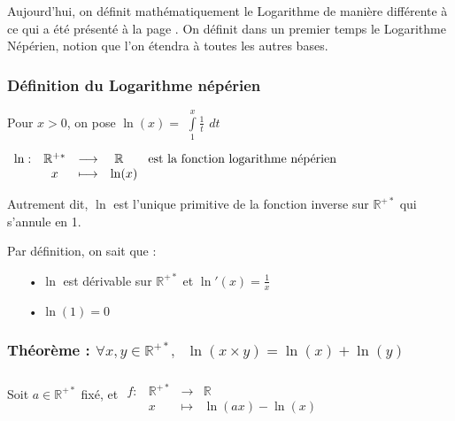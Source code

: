 \documentclass[a4paper, twoside]{article}
\begin{document}
	Aujourd'hui, on définit mathématiquement le Logarithme de manière différente à ce qui a été présenté à la page \pageref{intro_log}. On définit dans un premier temps le Logarithme Népérien, notion que l'on étendra à toutes les autres bases.

	\subsubsection*{Définition du Logarithme népérien}

	Pour $x>0$, on pose $\ln(x) =$ {\Large $\int\limits_1^x \frac{1}{t}$} {\large $dt$}\\

	\vspace{-3 mm}

	\begin{center}
	\begin{large}
	$\begin{array}{lccl}
	\ln : & \mathbb{R}^{+*} & \longrightarrow & ~ \mathbb{R} ~~~~~~ \text{{\normalsize est la fonction logarithme népérien}}\\
		& x & \longmapsto & \ln(x)
	\end{array}$
	\end{large}
	\end{center}

	Autrement dit, $\ln$ est l'unique primitive de la fonction inverse sur $\mathbb{R}^{+*}$ qui s'annule en 1.

	\vspace{3 mm}

	Par définition, on sait que :
	\begin{itemize}
		\item[•] $\ln$ est dérivable sur $\mathbb{R}^{+*}$ et $\ln '(x) = \frac{1}{x}$
		\item[•] $\ln(1)=0$\\
	\end{itemize}





	\subsubsection*{Théorème : $\forall x, y \in \mathbb{R}^{+*},$ {\Large $~\ln(x\times y) = \ln(x) + \ln(y)$}}

	\vspace{-3 mm}

	Soit $a \in \mathbb{R}^{+*}$ fixé, et $\begin{array}{lccl}
	&\\
											f : & \mathbb{R}^{+*} & \longrightarrow & \mathbb{R} \\
												& x               & \longmapsto     & \ln(ax) - \ln(x)
											\end{array}$\\
						
\end{document}

